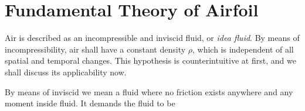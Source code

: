 \documentclass[a4paer, 12pt]{book}
\begin{document}
\chapter{Fundamental Theory of Airfoil}
\label{chap:fundamental_theory_of_airfoil}
\begin{article}
    Air is described as an incompressible and inviscid fluid, or \emph{idea fluid}. By means of incompressibility, air shall have a constant density $\rho$, which is independent of all spatial and temporal changes. This hypothesis is counterintuitive at first, and we shall discuss its applicability now.

    By means of inviscid we mean a fluid where no friction exists anywhere and any moment inside fluid. It demands the fluid to be 
\end{article}

\lipsum

\end{document}
